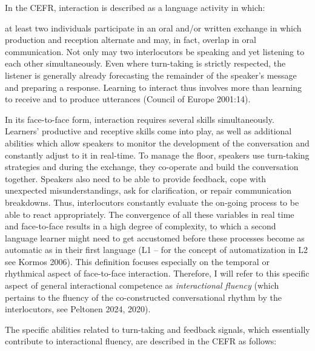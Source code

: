 \begin{styleStandard}
In the CEFR, interaction is described as a language activity in which: 
\end{styleStandard}

\begin{styleQuote}
at least two individuals participate in an oral and/or written exchange in which production and reception alternate and may, in fact, overlap in oral communication. Not only may two interlocutors be speaking and yet listening to each other simultaneously. Even where turn-taking is strictly respected, the listener is generally already forecasting the remainder of the speaker’s message and preparing a response. Learning to interact thus involves more than learning to receive and to produce utterances (Council of Europe 2001:14).
\end{styleQuote}

\begin{styleStandard}
In its face-to-face form, interaction requires several skills simultaneously. Learners’ productive and receptive skills come into play, as well as additional abilities which allow speakers to monitor the development of the conversation and constantly adjust to it in real-time. To manage the floor, speakers use turn-taking strategies and during the exchange, they co-operate and build the conversation together. Speakers also need to be able to provide feedback, cope with unexpected misunderstandings, ask for clarification, or repair communication breakdowns. Thus, interlocutors constantly evaluate the on-going process to be able to react appropriately. The convergence of all these variables in real time and face-to-face results in a high degree of complexity, to which a second language learner might need to get accustomed before these processes become as automatic as in their first language (L1 – for the concept of automatization in L2 see Kormos 2006). This definition focuses especially on the temporal or rhythmical aspect of face-to-face interaction. Therefore, I will refer to this specific aspect of general interactional competence as \textit{interactional fluency }(which pertains to the fluency of the co-constructed conversational rhythm by the interlocutors, see Peltonen 2024, 2020).
\end{styleStandard}

\begin{styleStandard}
The specific abilities related to turn-taking and feedback signals, which essentially contribute to interactional fluency, are described in the CEFR as follows:
\end{styleStandard}

